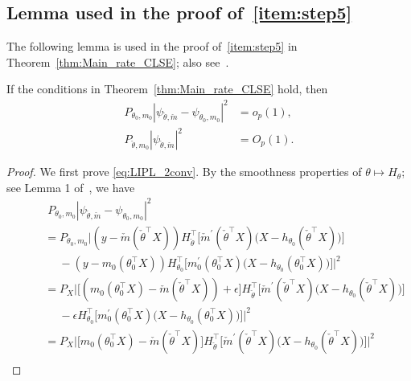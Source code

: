 {\subsection{Lemma used in the proof of~\ref{item:step5}}\label{app:nobias_part2CLSE}


The following lemma is used in the proof of~\ref{item:step5} in Theorem~\ref{thm:Main_rate_CLSE}; also see~\citet[Section 10.4]{Patra16}.

\begin{lemma} \label{thm:nobiasCLSE_part2}
If the conditions in Theorem~\ref{thm:Main_rate_CLSE} hold, then \begin{align}
P_{\theta_0, m_0} |\psi_{\check{\theta},\check{m}}- \psi_{\theta_0,m_0}|^2&=o_p(1),\label{eq:LIPL_2conv}\\
P_{\check{\theta}, m_0} |\psi_{\check{\theta},\check{m}}|^2&=O_p(1). \label{eq:LIPL_2bound}
\end{align}
\end{lemma}
\begin{proof}
We first prove \eqref{eq:LIPL_2conv}. 
By the smoothness properties of $\theta \mapsto H_\theta$; see Lemma 1 of~\cite{Patra16}, we have
\begin{align}
&\; P_{\theta_0, m_0} | \psi_{\check{\theta},\check{m}}- \psi_{\theta_0,m_0}|^2\\
\qquad&= P_{\theta_0, m_0} \Big|( y-\check{m}(\check{\theta} ^\top X)) H_{\check{\theta}}^\top \big[ \check{m}^\prime(\check{\theta} ^\top X) \big(X -h_{\theta_0} (\check{\theta}^\top X)\big)\big]\\
&\quad\; - ( y-m_0(\theta_0^\top X)) H_{\theta_0}^\top\big[ m_0^\prime(\theta_0^\top X) \big(X - h_{\theta_0} (\theta_0^\top X)\big)\big]\Big|^2\\
\qquad&= P_X \Big| \big[( m_0(\theta_0 ^\top X)-\check{m}(\check{\theta}^\top X))+\epsilon\big] H_{\check{\theta}}^\top \big[\check{m}^\prime(\check{\theta} ^\top X) \big(X -  h_{\theta_0}(\check{\theta} ^\top X)\big)\big] \\
&\quad\; -\epsilon H_{\theta_0}^\top\big[m_0^\prime(\theta_0^\top X) \big(X - h_{\theta_0} (\theta_0^\top X)\big)\big] \Big|^2\\
\qquad&= P_X \Big| \big[ m_0(\theta_0 ^\top X)-\check{m}(\check{\theta}^\top X)\big] H_{\check{\theta}}^\top \big[\check{m}^\prime(\check{\theta} ^\top X) \big(X -  h_{\theta_0}(\check{\theta} ^\top X)\big)\big]\Big|^2 \\

\end{align}
\end{proof}}
